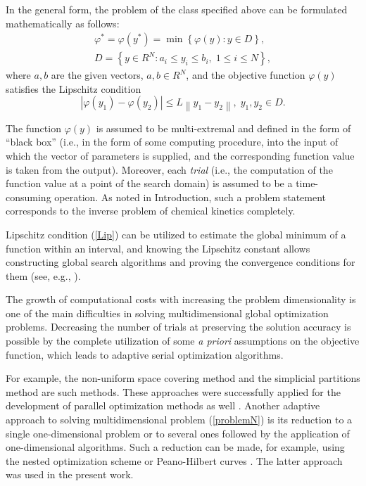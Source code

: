 \documentclass{svproc}
\begin{document}
In the general form, the problem of the class specified above can be formulated mathematically as 
follows:
\begin{gather}
 \varphi^* = \varphi(y^\ast)=\min{\left\{\varphi(y):y\in D\right\}}, \label{problemN}\\
 D=\left\{y\in R^N: a_i\leq y_i \leq b_i, \;  1\leq i \leq N\right\} \label{D},
\end{gather}
where $a,b$ are the given vectors, $a,b\in R^N$, and the objective function $\varphi(y)$ satisfies the Lipschitz condition
\begin{equation}\label{Lip}
\left|\varphi(y_1)-\varphi(y_2)\right|\leq L\left\|y_1-y_2\right\|,\; y_1,y_2 \in D.
\end{equation}

The function $\varphi(y)$ is assumed to be multi-extremal and defined in the form of ``black box'' (i.e., in the form of some computing procedure, into the input of which the vector of parameters is supplied, and the corresponding function value is taken from the output). Moreover, each \textit{trial} (i.e., the computation of the function value at a point of the search domain) is assumed to be a time-consuming operation. 
As noted in Introduction, such a problem statement corresponds to the inverse problem of chemical kinetics completely.

Lipschitz condition (\ref{Lip}) can be utilized to estimate the global minimum of a function within an interval, and knowing the Lipschitz constant allows constructing global search algorithms and proving the convergence conditions for them (see, e.g., \cite{Strongin2000}).

The growth of computational costs with increasing the problem dimensionality is one of the main difficulties in solving multidimensional global optimization problems. Decreasing the number of trials at preserving the solution accuracy is possible by the complete utilization of some {\it a priori} assumptions on the objective function, which leads to adaptive serial optimization algorithms.

For example, the non-uniform space covering method \cite{Evtushenko2013} and the simplicial partitions method \cite{Zilinskas2010} are such methods. These approaches were successfully applied for the development of parallel optimization methods as well \cite{Evtushenko2009,Paulavicius2011}. 
Another adaptive approach to solving multidimensional problem (\ref{problemN}) is its reduction to a single one-dimensional problem or to several ones followed by the application of one-dimensional algorithms. 
Such a reduction can be made, for example, using the nested optimization scheme \cite{Grishagin2018} or Peano-Hilbert curves \cite{Barkalov2018}. 
The latter approach was used in the present work.
\end{document}
